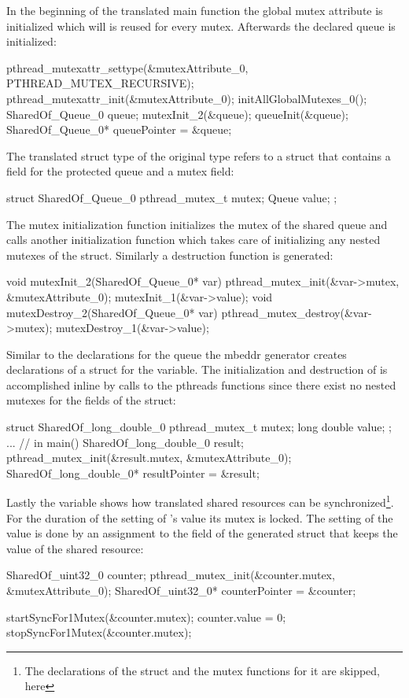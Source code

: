 In the beginning of the translated main function the global mutex attribute is initialized which will is reused for every mutex. Afterwards the declared queue is initialized:
\begin{ccode}
pthread_mutexattr_settype(&mutexAttribute_0, PTHREAD_MUTEX_RECURSIVE); 
pthread_mutexattr_init(&mutexAttribute_0); 
initAllGlobalMutexes_0(); 
SharedOf_Queue_0 queue; 
mutexInit_2(&queue); 
queueInit(&queue); 
SharedOf_Queue_0* queuePointer = &queue;
\end{ccode}
The translated struct type  of the original type  refers to a struct that contains a field for the protected queue and a mutex field:
\begin{ccode}
struct SharedOf_Queue_0 { 
  pthread_mutex_t mutex; 
  Queue value; 
};
\end{ccode}
The mutex initialization function  initializes the mutex of the shared queue and calls another initialization function which takes care of initializing any nested mutexes of the  struct. Similarly a destruction function is generated:
\begin{ccode}
void mutexInit_2(SharedOf_Queue_0* var) { 
  pthread_mutex_init(&var->mutex, &mutexAttribute_0); 
  mutexInit_1(&var->value); 
}
void mutexDestroy_2(SharedOf_Queue_0* var) { 
  pthread_mutex_destroy(&var->mutex);
  mutexDestroy_1(&var->value); 
}      
\end{ccode}
Similar to the declarations for the queue the mbeddr generator creates declarations of a struct for the  variable. The initialization and destruction of  is accomplished inline by calls to the pthreads functions since there exist no nested mutexes for the fields of the struct:
\begin{ccode}
struct SharedOf_long_double_0 { 
  pthread_mutex_t mutex; 
  long double value; 
};
... // in main()
SharedOf_long_double_0 result; 
pthread_mutex_init(&result.mutex, &mutexAttribute_0); 
SharedOf_long_double_0* resultPointer = &result;
\end{ccode}
Lastly the  variable shows how translated shared resources can be synchronized\footnote{The declarations of the struct and the mutex functions for it are skipped, here}. For the duration of the setting of 's value its mutex is locked. The setting of the value is done by an assignment to the  field of the generated struct that keeps the value of the shared resource:
\begin{ccode}
SharedOf_uint32_0 counter; 
pthread_mutex_init(&counter.mutex, &mutexAttribute_0); 
SharedOf_uint32_0* counterPointer = &counter;

startSyncFor1Mutex(&counter.mutex); 
{ counter.value = 0; } 
stopSyncFor1Mutex(&counter.mutex);
\end{ccode}


